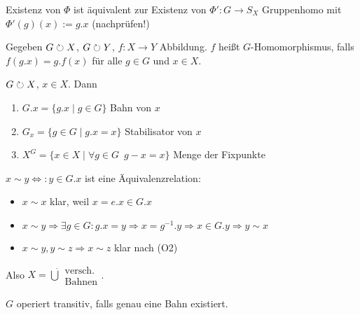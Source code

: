 \documentclass[12pt,a4paper]{scrartcl}
\begin{document}
\begin{bem}
	Existenz von $\Phi$ ist äquivalent zur Existenz von $\Phi'\colon G\to S_X$ Gruppenhomo mit $\Phi'(g)(x) := g.x$ (nachprüfen!)
\end{bem}

\begin{defi}
	Gegeben $G\circlearrowright X$, $G\circlearrowright Y$, $f\colon X\to Y$ Abbildung. $f$ heißt $G$-Homomorphismus, falls $f(g.x) = g.f(x)$ für alle $g\in G$ und $x\in X$.
\end{defi}

\begin{defi}
	$G\circlearrowright X$, $x\in X$. Dann\begin{enumerate}
		\item $G.x = \{g.x\mid g\in G\}$ Bahn von $x$
		\item $G_x = \{g\in G\mid g.x = x\}$ Stabilisator von $x$
		\item $X^G = \{x\in X\mid \forall g\in G\enspace g-x = x\}$ Menge der Fixpunkte
	\end{enumerate}
\end{defi}

\begin{bem}
	$x\sim y \Leftrightarrow : y\in G.x$ ist eine Äquivalenzrelation:\begin{itemize}
		\item $x\sim x$ klar, weil $x = e.x\in G.x$
		\item $x\sim y\Rightarrow \exists g\in G: g.x = y\Rightarrow x = g^{-1}.y\Rightarrow x\in G.y\Rightarrow y\sim x$
		\item $x\sim y, y\sim z\Rightarrow x\sim z$ klar nach (O2)
	\end{itemize}
	Also $X=\dot\bigcup\substack{\text{versch.}\\\text{Bahnen}}$.
\end{bem}

\begin{defi}
	$G$ operiert transitiv, falls genau eine Bahn existiert.
\end{defi}
\end{document}
